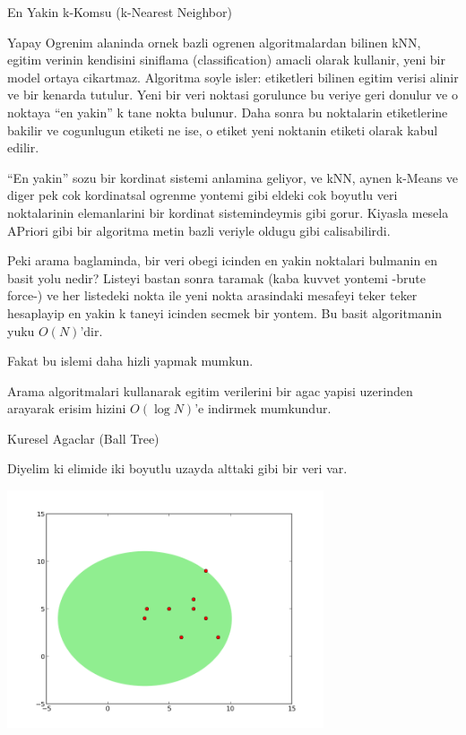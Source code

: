 \documentclass[12pt,fleqn]{article}\usepackage{../common}
\begin{document}
En Yakin k-Komsu (k-Nearest Neighbor)

Yapay Ogrenim alaninda ornek bazli ogrenen algoritmalardan bilinen kNN,
egitim verinin kendisini siniflama (classification) amacli olarak kullanir,
yeni bir model ortaya cikartmaz. Algoritma soyle isler: etiketleri bilinen
egitim verisi alinir ve bir kenarda tutulur. Yeni bir veri noktasi
gorulunce bu veriye geri donulur ve o noktaya ``en yakin'' k tane nokta
bulunur. Daha sonra bu noktalarin etiketlerine bakilir ve cogunlugun
etiketi ne ise, o etiket yeni noktanin etiketi olarak kabul edilir.

``En yakin'' sozu bir kordinat sistemi anlamina geliyor, ve kNN, aynen
k-Means ve diger pek cok kordinatsal ogrenme yontemi gibi eldeki cok
boyutlu veri noktalarinin elemanlarini bir kordinat sistemindeymis gibi
gorur. Kiyasla mesela APriori gibi bir algoritma metin bazli veriyle oldugu
gibi calisabilirdi.

Peki arama baglaminda, bir veri obegi icinden en yakin noktalari bulmanin
en basit yolu nedir? Listeyi bastan sonra taramak (kaba kuvvet yontemi
-brute force-) ve her listedeki nokta ile yeni nokta arasindaki mesafeyi
teker teker hesaplayip en yakin k taneyi icinden secmek bir yontem. Bu
basit algoritmanin yuku $O(N)$'dir. 

Fakat bu islemi daha hizli yapmak mumkun. 

Arama algoritmalari kullanarak egitim verilerini bir agac yapisi uzerinden
arayarak erisim hizini $O(\log N)$'e indirmek mumkundur. 

Kuresel Agaclar (Ball Tree) 

Diyelim ki elimide iki boyutlu uzayda alttaki gibi bir veri var. 

\includegraphics[height=7cm]{knn1.png}
\end{document}
